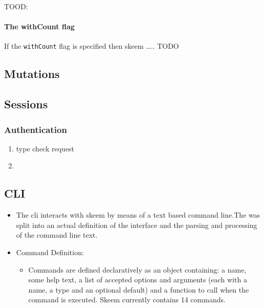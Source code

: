 \documentclass[
  12pt,
]{article}
\newcommand{\passthrough}[1]{#1}
\providecommand{\tightlist}{%
  \setlength{\itemsep}{0pt}\setlength{\parskip}{0pt}}
\let\oldparagraph\paragraph
\renewcommand{\paragraph}[1]{\oldparagraph{#1}\mbox{}}
\begin{document}
TOOD:

\hypertarget{the-withcount-flag}{%
\paragraph{The withCount flag}\label{the-withcount-flag}}

If the \passthrough{\lstinline!withCount!} flag is specified then skeem
\ldots.. TODO

\hypertarget{mutations}{%
\subsection{Mutations}\label{mutations}}

\hypertarget{sessions}{%
\subsection{Sessions}\label{sessions}}

\hypertarget{authentication-1}{%
\subsubsection{Authentication}\label{authentication-1}}

\begin{enumerate}
\def\labelenumi{\arabic{enumi}.}
\item
  type check request
\item
\end{enumerate}

\hypertarget{cli-1}{%
\subsection{CLI}\label{cli-1}}

\begin{itemize}
\tightlist
\item
  The cli interacts with skeem by means of a text based command line.The
  was split into an actual definition of the interface and the parsing
  and processing of the command line text.
\item
  Command Definition:

  \begin{itemize}
  \tightlist
  \item
    Commands are defined declaratively as an object containing: a name,
    some help text, a list of accepted options and arguments (each with
    a name, a type and an optional default) and a function to call when
    the command is executed. Skeem currently contains 14 commands.
  \end{itemize}
\end{itemize}
\end{document}

